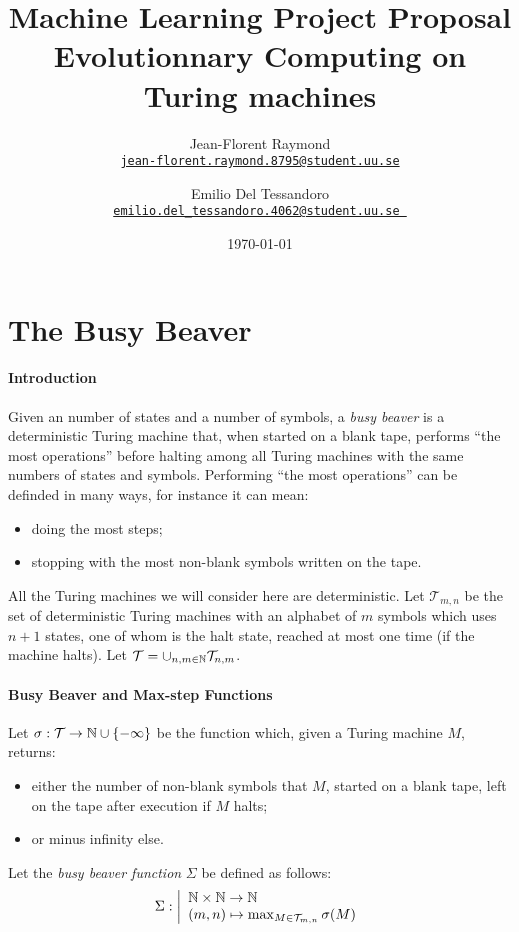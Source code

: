 \documentclass{article}
\title{Machine Learning Project Proposal\\\textbf{Evolutionnary Computing on\\Turing machines}}
\author{Jean-Florent Raymond\\\href{mailto:jean-florent.raymond.8795@student.uu.se}{\texttt{jean-florent.raymond.8795@student.uu.se}} \and Emilio Del Tessandoro\\
\href{mailto:emilio.del_tessandoro.4062@student.uu.se }{\texttt{emilio.del\_tessandoro.4062@student.uu.se }}}
\date{\today}
\begin{document}
\maketitle

\section{The Busy Beaver}

\paragraph{Introduction} Given an number of states and a number of symbols, a \emph{busy beaver} is a deterministic Turing machine that, when started on a blank tape, performs ``the most operations'' before halting among all Turing machines with the same numbers of states and symbols. Performing ``the most operations'' can be definded in many ways, for instance it can mean:
\begin{itemize}
\item doing the most steps;
\item stopping with the most non-blank symbols written on the tape.
\end{itemize}

All the Turing machines we will consider here are deterministic. Let $\mathcal{T}_{m,n}$ be the set of deterministic Turing machines with an alphabet of $m$ symbols which uses $n + 1$ states, one of whom is the halt state, reached at most one time (if the machine halts). Let  $\mathcal{T} = \cup_{n,m \in \mathbb{N}} \mathcal{T}_{n,m}$.


\paragraph{Busy Beaver and Max-step Functions}
Let $\sigma : \mathcal{T} \to \mathbb{N} \cup \{-\infty\}$ be the function which, given a Turing machine $M$, returns:
\begin{itemize}
\item either the number of non-blank symbols that $M$, started on a blank tape, left on the tape after execution if $M$ halts;
\item or minus infinity else.
\end{itemize}

Let the \emph{busy beaver function} $\Sigma$ be defined as follows:
\[
\Sigma : \left |
\begin{array}{l}
\mathbb{N} \times \mathbb{N} \to \mathbb{N}\\
(m,n) \mapsto \max_{M \in \mathcal{T}_{m,n}} \sigma(M)
\end{array}
\right .
\]
\end{document}
